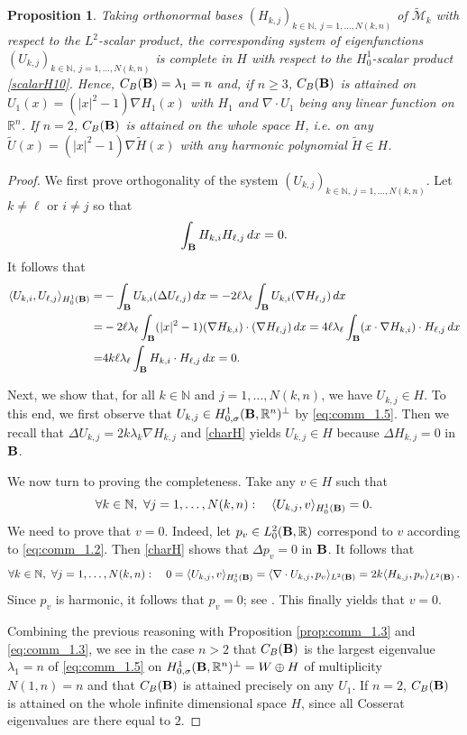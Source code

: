 \documentclass[11pt]{article}
\theoremstyle{plain}
\newtheorem{proposition}[theorem]{Proposition}
\theoremstyle{definition}
\numberwithin{equation}{section}
\newcommand{\R}{\mathbb{R}}
\newcommand{\N}{\mathbb{N}}
\newcommand{\B}{{\bf B}}
\begin{document}
\begin{proposition}\label{thm:comm_1.4}
	Taking orthonormal bases $\left( H_{k,j}\right)_{k\in \N ,\ j=1,\ldots,N(k,n)}$ of $\widetilde{\mathcal M}_k$ with respect to the
	$L^2$-scalar product, the corresponding system of eigenfunctions $\left( U_{k,j}\right)_{k\in \N ,\ j=1,\ldots,N(k,n)}$  is complete in $H$ with respect to the $H^1_0$-scalar product \eqref{scalarH10}.
	Hence, $C_B(\B)=\lambda_1=n$ and, if $n\ge 3$,
	$C_B(\B)$ is attained on $U_1(x)=(|x|^2-1)\nabla H_1(x)$ with $H_1$ and $\nabla \cdot U_1$ being any linear function on $\R^n$. If $n=2$, $C_B(\B)$ is attained on the whole space $H$, i.e. on any $\tilde U(x)=(|x|^2-1)\nabla \tilde H(x)$ with any harmonic polynomial $\tilde H\in H$.
\end{proposition}
\noindent
\begin{proof}
	We first prove  orthogonality of the system $\left( U_{k,j}\right)_{k\in \N ,\ j=1,\ldots,N(k,n)}$. Let $k\not=\ell$ or $i\not=j$ so that
	$$
	\int_\B H_{k,i} H_{\ell,j}\, dx =0.
	$$
	It follows that
	\begin{align*}
		\langle U_{k,i} , U_{\ell,j} \rangle_{H^1_0(\B)}=&-\int_\B U_{k,i} (\Delta U_{\ell,j})\, dx =-2\ell\lambda_\ell \int_\B U_{k,i} (\nabla H_{\ell,j})\, dx\\
		=& -2\ell\lambda_\ell \int_\B (|x|^2-1)(\nabla H_{k,i})\cdot (\nabla H_{\ell,j})\, dx
		=4 \ell\lambda_\ell \int_\B (x\cdot \nabla H_{k,i})\cdot H_{\ell,j}\, dx\\
		=& 4 k\ell\lambda_\ell \int_\B  H_{k,i}\cdot H_{\ell,j}\, dx=0.
	\end{align*}
	
	Next, we show that, for all $k\in \N$ and $j=1,\ldots,N(k,n)$, we have $U_{k,j}\in H$. To this end, we first observe that $U_{k,j}\in H^1_{0,\sigma}(\B,\R^n)^\perp$ by \eqref{eq:comm_1.5}. Then we recall that $\Delta U_{k,j}=2k\lambda_k \nabla H_{k,j}$ and  \eqref{charH} yields $U_{k,j}\in H$ because $\Delta H_{k,j}=0$ in $\B$.\par
	We now turn to proving the completeness. Take any $v\in H$ such that
	$$
	\forall k\in \N ,\ \forall j=1,\ldots,N(k,n):\quad \langle U_{k,j}, v\rangle_{H^1_0(\B)} =0.
	$$
	We need to prove that $v=0$. Indeed, let $p_v\in L^2_0(\B,\R)$ correspond to $v$ according to \eqref{eq:comm_1.2}.
	Then \eqref{charH}   shows that $\Delta p_v=0$ in $\B$.
	It follows that
	$$
	\forall k\in \N ,\ \forall j=1,\ldots,N(k,n):\quad 0=\langle U_{k,j}, v\rangle_{H^1_0(\B)} =\langle \nabla \cdot U_{k,j}, p_v\rangle_{L^2(\B)} =2k\langle H_{k,j}, p_v\rangle_{L^2(\B)}\, .
	$$
	Since $p_v$ is harmonic, it follows that $p_v=0$; see \cite[Theorem 5.5.III and Proposition 5.5.7]{Sauvigny_PDE_1}.
	This finally yields that $v=0$.
	
	Combining the previous reasoning with Proposition \ref{prop:comm_1.3} and \eqref{eq:comm_1.3}, we see
	in the case $n>2$ that $C_B(\B)$ is the largest eigenvalue $\lambda_1=n$ of \eqref{eq:comm_1.5} on $H^1_{0,\sigma}(\B,\R^n)^\perp=W\oplus H$ of multiplicity $N(1,n)=n$ and that $C_B(\B)$ is attained precisely
on any $U_1$.
If $n=2$, $C_B(\B)$ is attained on the whole infinite dimensional space $H$, since all Cosserat eigenvalues are there equal to $2$.
\end{proof}
\end{document}
